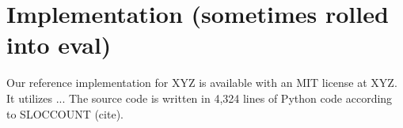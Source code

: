 \section{Implementation (sometimes rolled into eval)}
\label{SEC:implementation}

Our reference implementation for XYZ is available with an MIT license at
XYZ. It utilizes ...  The source code is written in 4,324 lines of Python code
according to SLOCCOUNT (cite).

